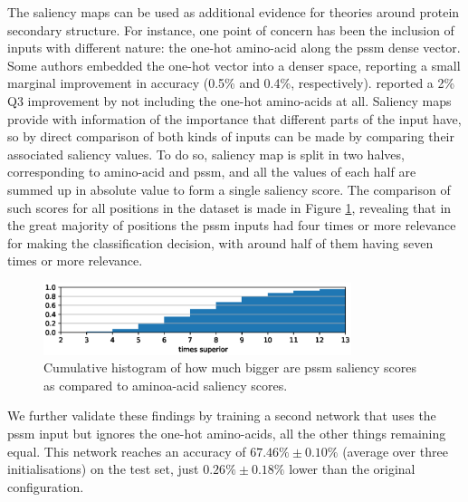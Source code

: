 \documentclass{article}
\begin{document}
The saliency maps can be used as additional evidence for theories around protein secondary structure. For instance, one point of concern has been the inclusion of inputs with different nature: the one-hot amino-acid along the pssm dense vector. Some authors \cite{Li2016,Zhou2018} embedded the one-hot vector into a denser space, reporting a small marginal improvement in accuracy (0.5\% and 0.4\%, respectively). \cite{Spencer2015} reported a 2\% Q3 improvement by not including the one-hot amino-acids at all. Saliency maps provide with information of the importance that different parts of the input have, so by direct comparison of both kinds of inputs can be made by comparing their associated saliency values. To do so, saliency map is split in two halves, corresponding to amino-acid and pssm, and all the values of each half are summed up in absolute value to form a single saliency score. The comparison of such scores for all positions in the dataset is made in Figure \ref{fig:aa_pssm}, revealing that in the great majority of positions the pssm inputs had four times or more relevance for making the classification decision, with around half of them having seven times or more relevance.
\begin{figure}
	\centering
	\centerline{\includegraphics[width=9cm]{aa_pssm}}
	\caption{Cumulative histogram of how much bigger are pssm saliency scores as compared to aminoa-acid saliency scores.}
	\label{fig:aa_pssm}
\end{figure}
We further validate these findings by training a second network that uses the pssm input but ignores the one-hot amino-acids, all the other things remaining equal. This network reaches an accuracy of $67.46\%\pm0.10\%$ (average over three initialisations) on the test set, just $0.26\%\pm0.18\%$ lower than the original configuration.
\end{document}
